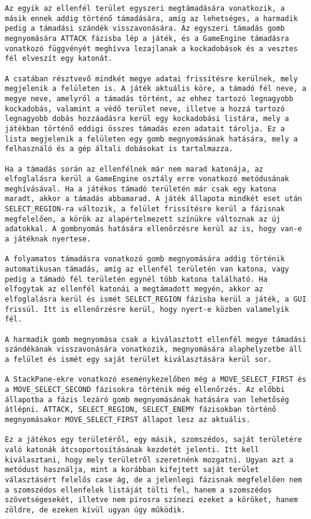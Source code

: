 \begin{verbatim}
Az egyik az ellenfél terület egyszeri megtámadására vonatkozik, a másik ennek addig történő támadására, amíg az lehetséges, a harmadik pedig a támadási szándék visszavonására. Az egyszeri támadás gomb megnyomására ATTACK fázisba lép a játék, és a GameEngine támadásra vonatkozó függvényét meghívva lezajlanak a kockadobások és a vesztes fél elveszít egy katonát. 

A csatában résztvevő mindkét megye adatai frissítésre kerülnek, mely megjelenik a felületen is. A játék aktuális köre, a támadó fél neve, a megye neve, amelyről a támadás történt, az ehhez tartozó legnagyobb kockadobás, valamint a védő terület neve, illetve a hozzá tartozó legnagyobb dobás hozzáadásra kerül egy kockadobási listára, mely a játékban történő eddigi összes támadás ezen adatait tárolja. Ez a lista megjelenik a felületen egy gomb megnyomásának hatására, mely a felhasználó és a gép általi dobásokat is tartalmazza. 

Ha a támadás során az ellenfélnek már nem marad katonája, az elfoglalásra kerül a GameEngine osztály erre vonatkozó metódusának meghívásával. Ha a játékos támadó területén már csak egy katona maradt, akkor a támadás abbamarad. A játék állapota mindkét eset után SELECT_REGION-ra változik, a felület frissítésre kerül a fázisnak megfelelően, a körök az alapértelmezett színükre változnak az új adatokkal. A gombnyomás hatására ellenőrzésre kerül az is, hogy van-e a játéknak nyertese. 

A folyamatos támadásra vonatkozó gomb megnyomására addig történik automatikusan támadás, amíg az ellenfél területén van katona, vagy pedig a támadó fél területén egynél több katona található. Ha elfogytak az ellenfél katonái a megtámadott megyén, akkor az elfoglalásra kerül és ismét SELECT_REGION fázisba kerül a játék, a GUI frissül. Itt is ellenőrzésre kerül, hogy nyert-e közben valamelyik fél. 

A harmadik gomb megnyomása csak a kiválasztott ellenfél megye támadási szándékának visszavonására vonatkozik, megnyomására alaphelyzetbe áll a felület és ismét egy saját terület kiválasztására kerül sor. 

A StackPane-ekre vonatkozó eseménykezelőben még a MOVE_SELECT_FIRST és a MOVE_SELECT_SECOND fázisokra történik még ellenőrzés. Az előbbi állapotba a fázis lezáró gomb megnyomásának hatására van lehetőség átlépni. ATTACK, SELECT_REGION, SELECT_ENEMY fázisokban történő megnyomásakor MOVE_SELECT_FIRST állapot lesz az aktuális. 

Ez a játékos egy területéről, egy másik, szomszédos, saját területére való katonák átcsoportosításának kezdetét jelenti. Itt kell kiválasztani, hogy mely területről szeretnénk mozgatni. Ugyan azt a metódust használja, mint a korábban kifejtett saját terület választásért felelős case ág, de a jelenlegi fázisnak megfelelően nem a szomszédos ellenfelek listáját tölti fel, hanem a szomszédos szövetségesekét, illetve nem pirosra színezi ezeket a köröket, hanem zöldre, de ezeken kívül ugyan úgy működik. 


\end{verbatim}
